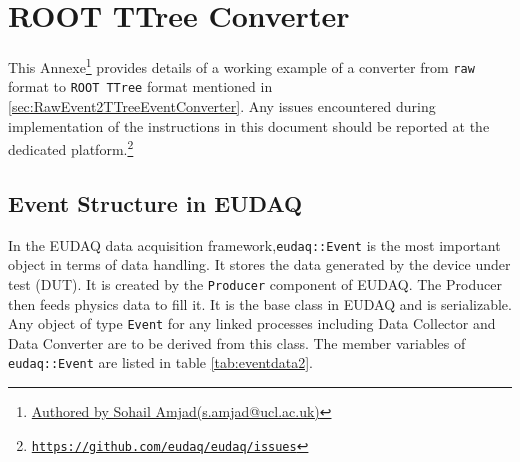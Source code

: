 \section{ROOT TTree Converter}
\label{sec:TTreeConverter}

This Annexe\footnote{\href{mailto:s.amjad@ucl.ac.uk} {Authored by Sohail Amjad(s.amjad@ucl.ac.uk)}} provides details of a working example of a converter from \lstinline[style=cpp]{raw} format to \lstinline[style=cpp]{ROOT TTree} format mentioned in \ref{sec:RawEvent2TTreeEventConverter}. Any issues encountered during implementation of the instructions in this document should be reported at the dedicated platform.\footnote{\href{https://github.com/eudaq/eudaq/issues}\texttt{https://github.com/eudaq/eudaq/issues}}

\subsection{Event Structure in EUDAQ} 

In the EUDAQ data acquisition framework,\lstinline[style=cpp]{eudaq::Event} is the most important object in terms of data handling. It stores the data generated by the device under test (DUT). It is created by the \lstinline[style=cpp]{Producer} component of EUDAQ. The Producer then feeds physics data to fill it. It is the base class in EUDAQ and is serializable. Any object of type \lstinline[style=cpp]{Event} for any linked processes including Data Collector and Data Converter are to be derived from this class. The member variables of \lstinline[style=cpp]{eudaq::Event} are listed in table \ref{tab:eventdata2}. 

